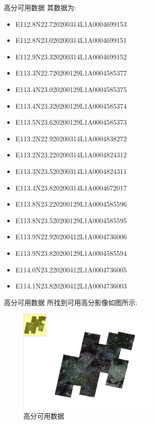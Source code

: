 \begin{frame}{高分可用数据}
    其数据为:
    \tiny
    \begin{itemize}
        \item E112.8N22.720200314L1A0004699153
        \item E112.8N23.020200314L1A0004699151
        \item E112.9N23.320200314L1A0004699152
        \item E113.3N22.720200129L1A0004585377
        \item E113.4N23.020200129L1A0004585375
        \item E113.4N23.320200129L1A0004585374
        \item E113.5N23.620200129L1A0004585373
        \item E113.2N22.920200314L1A0004838272
        \item E113.2N23.220200314L1A0004824312
        \item E113.3N23.520200314L1A0004824311
        \item E113.4N23.820200314L1A0004672017
        \item E113.8N23.220200129L1A0004585596
        \item E113.8N23.520200129L1A0004585595
        \item E113.9N22.920200412L1A0004736006
        \item E113.9N23.820200129L1A0004585594
        \item E114.0N23.220200412L1A0004736005
        \item E114.1N23.820200412L1A0004736003
    \end{itemize}
\end{frame}

\begin{frame}{高分可用数据}
    所找到可用高分影像如图所示:
    \begin{figure}
        \centering
        \includegraphics[width=7cm]{pic/pic0114.jpg}
        \caption{高分可用数据}
        \label{fig:0109}
    \end{figure}
\end{frame}

